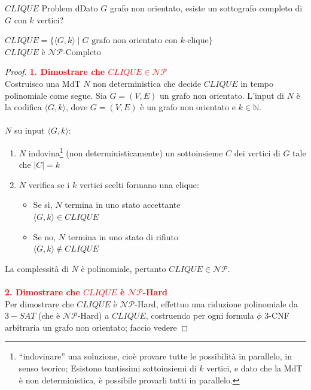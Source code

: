 \documentclass{article}  %
\theoremstyle{definition}
\begin{document}
\begin{theorem}{$CLIQUE$ Problem}
	dDato $G$ grafo non orientato, esiste un sottografo completo di $G$ con $k$ vertici?
	\begin{center}
		$CLIQUE = \{\langle G,k \rangle \mid G \text{ grafo non orientato con } k\text{-clique}\}$ \\
		$CLIQUE$ è $\mathcal{NP}$-Completo
	\end{center}
	\footnotesize
	\begin{proof}
		\textcolor{red}{\textbf{1. Dimostrare che $CLIQUE \in \mathcal{NP}$}} \\
		Costruisco una MdT $N$ non deterministica che decide $CLIQUE$ in tempo polinomiale come segue. Sia $G=(V,E)$ un grafo non orientato.
		L'input di \( N \) è la codifica \( \langle G, k \rangle \), dove \( G = (V, E) \) è un grafo non orientato e \( k \in \mathbb{N} \). \\ \\
		$N$ su input $\langle G,k \rangle$:
		\begin{enumerate}
			\item $N$ indovina\footnote{
				      “indovinare” una soluzione, cioè provare tutte le possibilità in parallelo, in senso teorico;
				      Esistono tantissimi sottoinsiemi di $k$ vertici, e dato che la MdT è non deterministica, è possibile
				      provarli tutti in parallelo.
			      } (non deterministicamente) un sottoinsieme $C$ dei vertici di $G$ tale che $|C|=k$
			\item $N$ verifica se i $k$ vertici scelti formano una clique:
			      \begin{itemize}
				      \item Se sì, $N$ termina in uno stato accettante \\
				            $\langle G,k \rangle \in CLIQUE$
				      \item Se no, $N$ termina in uno stato di rifiuto \\
				            $\langle G,k \rangle \notin CLIQUE$
			      \end{itemize}
		\end{enumerate}
		La complessità di $N$ è polinomiale, pertanto $CLIQUE \in \mathcal{NP}$. \\ \\
		\textcolor{red}{\textbf{2. Dimostrare che $CLIQUE$ è $\mathcal{NP}$-Hard}} \\
		Per dimostrare che $CLIQUE$ è $\mathcal{NP}$-Hard, effettuo una riduzione polinomiale da $3-SAT$ (che è $\mathcal{NP}$-Hard)
		a $CLIQUE$, costruendo per ogni formula $\phi$ 3-CNF arbitraria un grafo non orientato; faccio vedere

\end{proof}
\end{theorem}
\end{document}
